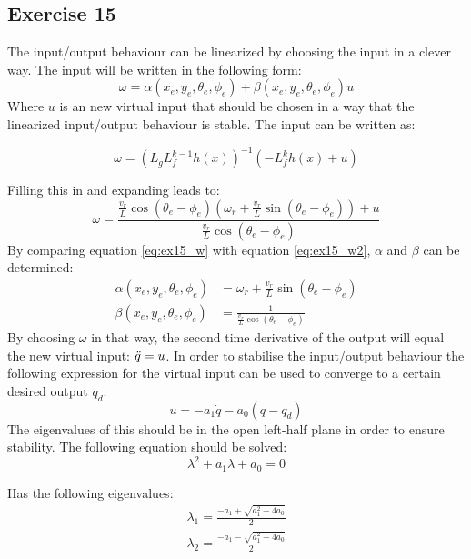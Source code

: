 \subsection{Exercise 15}

The input/output behaviour can be linearized by choosing the input in a clever way. The input will be written in the following form:
\begin{equation}
    \omega = \alpha(x_e, y_e, \theta_e, \phi_e) + \beta(x_e, y_e, \theta_e, \phi_e) u
    \label{eq:ex15_w}
\end{equation}
Where $u$ is an new virtual input that should be chosen in a way that the linearized input/output behaviour is stable. The input can be written as:

\begin{equation}
    \omega = (L_g L_f^{k-1} h(x))^{-1} (-L_f^k h(x) + u)
    \label{eq:ex15_w1}
\end{equation}

Filling this in and expanding leads to:
\begin{equation}
    \omega = \frac{\frac{v_r}{L}\cos(\theta_e - \phi_e)(\omega_r + \frac{v_r}{L}\sin(\theta_e - \phi_e)) + u}{\frac{v_r}{L} \cos(\theta_e - \phi_e)}
    \label{eq:ex15_w2}
\end{equation}
By comparing equation \eqref{eq:ex15_w} with equation \eqref{eq:ex15_w2}, $\alpha$ and $\beta$ can be determined:
\begin{align}
    \alpha(x_e, y_e, \theta_e, \phi_e) &= \omega_r + \frac{v_r}{L}\sin(\theta_e - \phi_e) \label{eq:ex15_alpha} \\
    \beta(x_e, y_e, \theta_e, \phi_e) &= \frac{1}{\frac{v_r}{L} \cos(\theta_e - \phi_e)}
\end{align}
By choosing $\omega$ in that way, the second time derivative of the output will equal the new virtual input: $\Ddot{q} = u$. In order to stabilise the input/output behaviour the following expression for the virtual input can be used to converge to a certain desired output $q_d$:
\begin{equation}
    u = -a_1 \dot{q} - a_0 (q - q_d)
    \label{eq:ex15_u}
\end{equation}
The eigenvalues of this should be in the open left-half plane in order to ensure stability. The following equation should be solved:
\begin{equation}
    \lambda^2 + a_1 \lambda + a_0 = 0
    \label{eq:ex15_eigvaleq}
\end{equation}

Has the following eigenvalues:
\begin{align}
    \lambda_1 = \frac{-a_1 + \sqrt{a_1^2 - 4a_0}}{2} \label{eq:ex15_lam1} \\
    \lambda_2 = \frac{-a_1 - \sqrt{a_1^2 - 4a_0}}{2} \label{eq:ex15_lam2} 
\end{align}


